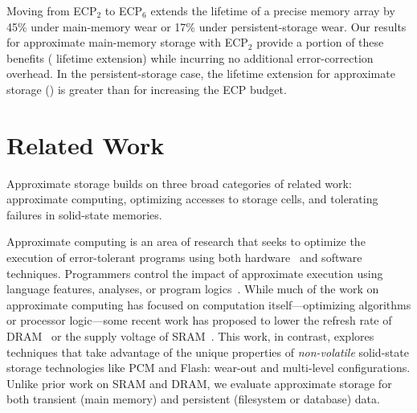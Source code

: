 Moving from ECP$_2$ to ECP$_6$ extends the lifetime of a precise memory array
by 45\% under main-memory wear or 17\% under persistent-storage wear.
Our
results for approximate main-memory storage with ECP$_2$ provide a
portion of these benefits ( lifetime extension) while incurring no
additional error-correction overhead. In the persistent-storage case, the
lifetime extension for approximate storage () is greater than for
increasing the ECP budget.




\section{Related Work}
\label{approxstorage:sec:related}

Approximate storage builds on three broad categories of related work:
approximate computing, optimizing accesses to storage
cells, and tolerating failures in solid-state memories.

Approximate computing is an area of research that seeks to optimize the
execution of error-tolerant programs using both
hardware~\cite{flikker,truffle,npu,relax,pcmos,stochasticproc} and software~\cite{green,perforation,dynamicknobs} techniques. Programmers control the impact of approximate execution using language features, analyses, or program
logics~\cite{enerj,relax,carbin_pldi12,rely}. While much of the work on
approximate computing has focused on computation itself---optimizing algorithms
or processor logic---some recent work has proposed to lower the refresh rate of
DRAM~\cite{flikker} or the supply voltage of
SRAM~\cite{truffle,hybridsram,sramerrors}. This work, in contrast, explores techniques that take advantage
of the unique properties of \emph{non-volatile} solid-state storage
technologies like PCM and Flash: wear-out and multi-level configurations.
Unlike prior work on SRAM and DRAM, we evaluate approximate storage for both
transient (main memory) and persistent (filesystem or database) data.

